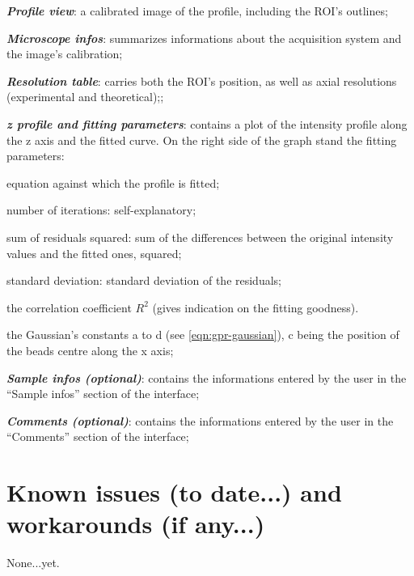 \documentclass[a4paper, 11pt]{report}%
\begin{document}
\begin{itemize*}
	\item \textbf{\textit{Profile view}}: a calibrated image of the profile, including the ROI's outlines;
	\item \textbf{\textit{Microscope infos}}: summarizes informations about the acquisition system and the image's calibration;
	\item \textbf{\textit{Resolution table}}: carries both the ROI's position, as well as axial resolutions (experimental and theoretical);;
	\item \textbf{\textit{z profile and fitting parameters}}: contains a plot of the intensity profile along the z axis and the fitted curve. On the right side of the graph stand the fitting parameters:
		\begin{itemize*}
			\item equation against which the profile is fitted;
			\item number of iterations: self-explanatory;
			\item sum of residuals squared: sum of the differences between the original intensity values and the fitted ones, squared;
			\item standard deviation: standard deviation of the residuals;
			\item the correlation coefficient $R^{2}$ (gives indication on the fitting goodness).
			\item the Gaussian's constants a to d (see \ref{eqn:gpr-gaussian}), c being the position of the beads centre along the x axis;	
		\end{itemize*}
	\item \textbf{\textit{Sample infos (optional)}}: contains the informations entered by the user in the ``Sample infos'' section of the interface;
	\item \textbf{\textit{Comments (optional)}}: contains the informations entered by the user in the ``Comments'' section of the interface;
\end{itemize*}


\section{Known issues (to date...) and workarounds (if any...)}
\label{sec:garr-ki}

None...yet.
\end{document}
